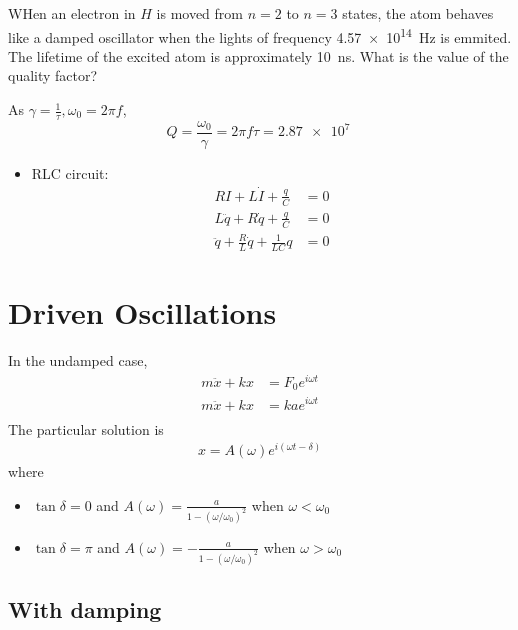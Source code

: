 \documentclass[a4paper]{article}
\numberwithin{equation}{section}
\begin{document}
\begin{example}
    WHen an electron in $H$ is moved from $n=2$ to $n=3$ states, the atom behaves like a damped oscillator when the lights of frequency \SI{4.57e+14}{\hertz} is emmited. The lifetime of the excited atom is approximately \SI{10}{\nano\second}. What is the value of the quality factor?
\end{example}
\begin{sol}
    As $\gamma=\frac{1}{\tau}, \omega_0=2\pi f$, 
    \begin{equation}
        Q=\frac{\omega_0}{\gamma}=2\pi f\tau=\SI{2.87e+7}{}
    \end{equation}
\end{sol}
\begin{itemize}
    \item RLC circuit:
    \begin{align}
        RI+L\dot I+\frac{q}{C}&=0\\
        L\ddot q+R\dot q+\frac{q}{C}&=0\\
        \ddot q+\frac{R}{L}\dot q+\frac{1}{LC}q&=0
    \end{align}
\end{itemize}
\section{Driven Oscillations}
In the undamped case,
\begin{align}
    m\ddot x+kx&=F_0e^{i\omega t}\\
    m\ddot x+kx&=ka e^{i\omega t}\\
\end{align}
The particular solution is 
\begin{align}
    x=A(\omega)e^{i(\omega t-\delta)}
\end{align} 
where
\begin{itemize}
    \item $\tan\delta=0$ and $A(\omega)=\frac{a}{1-(\omega/\omega_0)^2}$ when $\omega<\omega_0$
    \item $\tan\delta=\pi$ and $A(\omega)=-\frac{a}{1-(\omega/\omega_0)^2}$ when $\omega>\omega_0$
\end{itemize}

\subsection{With damping}
\end{document}
